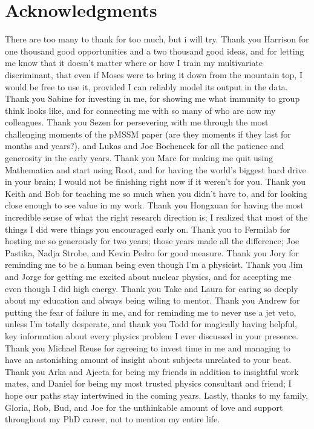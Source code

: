 \section*{Acknowledgments}
There are too many to thank for too much, but i will try. Thank you Harrison for one thousand good opportunities and a two thousand good ideas, and for letting me know that it doesn't matter where or how I train my multivariate discriminant, that even if Moses were to bring it down from the mountain top, I would be free to use it, provided I can reliably model its output in the data. Thank you Sabine for investing in me, for showing me what immunity to group think looks like, and for connecting me with so many of who are now my colleagues. Thank you Sezen for persevering with me through the most challenging moments of the pMSSM paper (are they moments if they last for months and years?), and Lukas and Joe Bocheneck for all the patience and generosity in the early years. Thank you Marc for making me quit using Mathematica and start using Root, and for having the world's biggest hard drive in your brain; I would not be finishing right now if it weren't for you. Thank you Keith and Bob for teaching me so much when you didn't have to, and for looking close enough to see value in my work. Thank you Hongxuan for having the most incredible sense of what the right research direction is; I realized that most of the things I did were things you encouraged early on. Thank you to Fermilab for hosting me so generously for two years; those years made all the difference; Joe Pastika, Nadja Strobe, and Kevin Pedro for good measure. Thank you Jory for reminding me to be a human being even though I'm a physicist. Thank you Jim and Jorge for getting me excited about nuclear physics, and for accepting me even though I did high energy. Thank you Take and Laura for caring so deeply about my education and always being wiling to mentor. Thank you Andrew for putting the fear of failure in me, and for reminding me to never use a jet veto, unless I'm totally desperate, and thank you Todd for magically having helpful, key information about every physics problem I ever discussed in your presence. Thank you Michael Reuse for agreeing to invest time in me and managing to have an astonishing amount of insight about subjects unrelated to your beat. Thank you Arka and Ajeeta for being my friends in addition to insightful work mates, and Daniel for being my most trusted physics consultant and friend; I hope our paths stay intertwined in the coming years. Lastly, thanks to my family, Gloria, Rob, Bud, and Joe for the unthinkable amount of love and support throughout my PhD career, not to mention my entire life. 